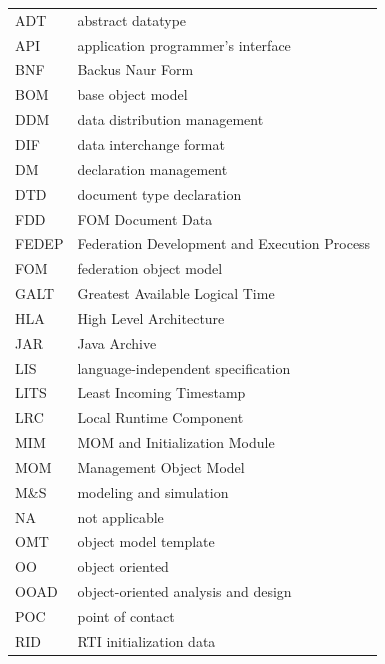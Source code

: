 \begin{tabular}{@{}p{50pt}p{382pt}@{}}
    ADT   & abstract datatype                            \\
    API   & application programmer's interface           \\
    BNF   & Backus Naur Form                             \\
    BOM   & base object model                            \\
    DDM   & data distribution management                 \\
    DIF   & data interchange format                      \\
    DM    & declaration management                       \\
    DTD   & document type declaration                    \\
    FDD   & FOM Document Data                            \\
    FEDEP & Federation Development and Execution Process \\
    FOM   & federation object model                      \\
    GALT  & Greatest Available Logical Time              \\
    HLA   & High Level Architecture                      \\
    JAR   & Java Archive                                 \\
    LIS   & language-independent specification           \\
    LITS  & Least Incoming Timestamp                     \\
    LRC   & Local Runtime Component                      \\
    MIM   & MOM and Initialization Module                \\
    MOM   & Management Object Model                      \\
    M\&S  & modeling and simulation                      \\
    NA    & not applicable                               \\
    OMT   & object model template                        \\
    OO    & object oriented                              \\
    OOAD  & object-oriented analysis and design          \\
    POC   & point of contact                             \\
    RID   & RTI initialization data                      \\

\end{tabular}
